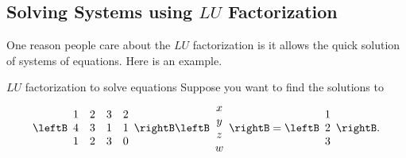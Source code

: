 \subsection{Solving Systems using $LU$ Factorization}

One reason people care about the $LU$ factorization
 is it allows the quick solution of
systems of equations. Here is an example.

\begin{example}{$LU$ factorization to solve equations}{}
Suppose you want to find the solutions to
\begin{equation*}
\leftB
\begin{array}{rrrr}
1 & 2 & 3 & 2 \\
4 & 3 & 1 & 1 \\
1 & 2 & 3 & 0
\end{array}
\rightB \leftB
\begin{array}{c}
x \\
y \\
z \\
w
\end{array}
\rightB =\leftB
\begin{array}{c}
1 \\
2 \\
3
\end{array}
\rightB .
\end{equation*}
\end{example}

